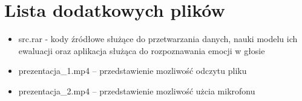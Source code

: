 \documentclass[12pt,titlepage]{article}
\begin{document}
\section{Lista dodatkowych plików}
\begin{itemize}
    \item src.rar - kody źródłowe służące do przetwarzania danych, nauki modelu ich ewaluacji oraz aplikacja służąca do rozpoznawania emocji w głosie
    \item prezentacja\_1.mp4 -- przedstawienie mozliwość odczytu pliku
    \item prezentacja\_2.mp4 -- przedstawienie mozliwość użcia mikrofonu
\end{itemize}
\end{document}
